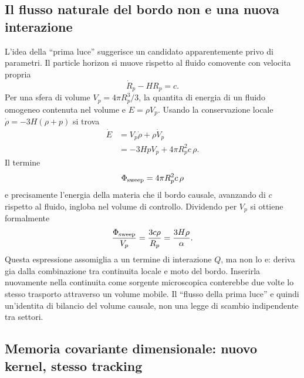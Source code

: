 \documentclass[11pt,a4paper]{article}
\begin{document}
\subsection{Il flusso naturale del bordo non e una nuova interazione}

L'idea della ``prima luce'' suggerisce un candidato apparentemente privo di parametri. Il particle horizon si muove rispetto al fluido comovente con velocita propria
\begin{equation}
 \dot R_p-HR_p=c.
\end{equation}
Per una sfera di volume $V_p=4\pi R_p^3/3$, la quantita di energia di un fluido omogeneo contenuta nel volume e $E=\rho V_p$. Usando la conservazione locale $\dot\rho=-3H(\rho+p)$ si trova
\begin{align}
 \dot E
 &=V_p\dot\rho+\rho\dot V_p\\
 &=-3HpV_p+4\pi R_p^2 c\,\rho.
 \label{eq:r12d_reynolds}
\end{align}
Il termine
\begin{equation}
 \Phi_{\rm sweep}=4\pi R_p^2c\,\rho
\end{equation}
e precisamente l'energia della materia che il bordo causale, avanzando di $c$ rispetto al fluido, ingloba nel volume di controllo. Dividendo per $V_p$ si ottiene formalmente
\begin{equation}
 \frac{\Phi_{\rm sweep}}{V_p}=\frac{3c\rho}{R_p}=\frac{3H\rho}{\alpha}.
 \label{eq:r12d_sweep_rate}
\end{equation}
Questa espressione assomiglia a un termine di interazione $Q$, ma non lo e: deriva gia dalla combinazione tra continuita locale e moto del bordo. Inserirla nuovamente nella continuita come sorgente microscopica conterebbe due volte lo stesso trasporto attraverso un volume mobile. Il ``flusso della prima luce'' e quindi un'identita di bilancio del volume causale, non una legge di scambio indipendente tra settori.

\subsection{Memoria covariante dimensionale: nuovo kernel, stesso tracking}
\end{document}

